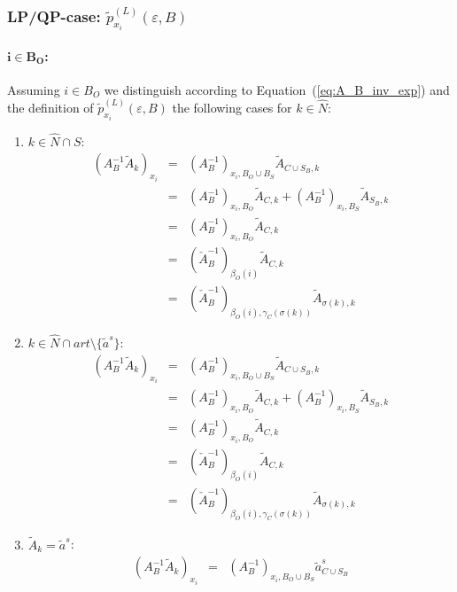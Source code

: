 \documentclass[a4paper]{article}
\begin{document}
\subsubsection{LP/QP-case: $\tilde{p}_{x_{i}}^{(L)}(\varepsilon, B)$}
\paragraph{$\mathbf{i \in B_{O}}$:}
Assuming $i \in B_{O}$ we distinguish
according to Equation~(\ref{eq:A_B_inv_exp})
and the definition of $\tilde{p}_{x_{i}}^{(L)}(\varepsilon, B)$ the
following cases for $k \in \hat{N}$:
\begin{enumerate}
\item $k \in \hat{N} \cap S$:
\begin{eqnarray}
 (A_{B}^{-1}\tilde{A}_{k})_{x_{i}} &=&
  (A_{B}^{-1})_{x_{i}, B_{O} \cup B_{S}}\tilde{A}_{C \cup S_{B}, k}
  \nonumber \\
  &=&
  (A_{B}^{-1})_{x_{i}, B_{O}}\tilde{A}_{C, k} +
  (A_{B}^{-1})_{x_{i}, B_{S}}\tilde{A}_{S_{B}, k} 
  \nonumber \\
  &=&  
  (A_{B}^{-1})_{x_{i}, B_{O}}\tilde{A}_{C, k} 
  \nonumber \\
  &=&
  \left(\check{A}_{B}^{-1}\right)_{\beta_{O}(i)}\tilde{A}_{C, k}
  \nonumber \\
  &=&
  \left(\check{A}_{B}^{-1}\right)_{\beta_{O}(i), \gamma_{C}(\sigma(k))}
  \tilde{A}_{\sigma(k), k}
\end{eqnarray}
\item $k \in \hat{N} \cap art \setminus \{\tilde{a}^{s}\}$:
\begin{eqnarray}
  (A_{B}^{-1}\tilde{A}_{k})_{x_{i}} &=&
  (A_{B}^{-1})_{x_{i}, B_{O} \cup B_{S}}\tilde{A}_{C \cup S_{B}, k}
  \nonumber \\
  &=&
  (A_{B}^{-1})_{x_{i}, B_{O}}\tilde{A}_{C, k} +
  (A_{B}^{-1})_{x_{i}, B_{S}}\tilde{A}_{S_{B}, k} 
  \nonumber \\ 
  &=&
  (A_{B}^{-1})_{x_{i}, B_{O}}\tilde{A}_{C, k} 
  \nonumber \\ 
  &=&
  \left(\check{A}_{B}^{-1}\right)_{\beta_{O}(i)}\tilde{A}_{C, k}
  \nonumber \\
  &=&
  \left(\check{A}_{B}^{-1}\right)_{\beta_{O}(i), \gamma_{C}(\sigma(k))}
  \tilde{A}_{\sigma(k), k}    
\end{eqnarray}
\item $\tilde{A}_{k}=\tilde{a}^{s}$:
\begin{eqnarray}
  (A_{B}^{-1}\tilde{A}_{k})_{x_{i}} &=& 
  (A_{B}^{-1})_{x_{i}, B_{O} \cup B_{S}} \tilde{a}_{C \cup S_{B}}^{s}

\end{eqnarray}
\end{enumerate}
\end{document}
